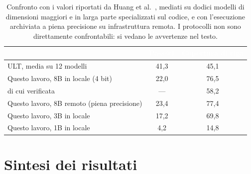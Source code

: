 \begin{table}[H]
\centering
\caption{Confronto con i valori riportati da Huang et al.~\cite{huang2025ult},
mediati su dodici modelli di dimensioni maggiori e in larga parte specializzati
sul codice, e con l'esecuzione archiviata a piena precisione su infrastruttura
remota. I protocolli non sono direttamente confrontabili: si vedano le
avvertenze nel testo.}
\label{tab:confronto}
\begin{tabular}{lcc}
\hline
\rowcolor{intest}
& \textcolor{white}{\textbf{Pass@1}} &
\textcolor{white}{\textbf{Copertura di riga}} \\
\hline
ULT, media su 12 modelli \cite{huang2025ult} & 41,3 & 45,1 \\
\hline
\rowcolor{accento}
Questo lavoro, 8B in locale (4 bit) & 22,0 & 76,5 \\
\rowcolor{accento}
\quad di cui verificata             & ---  & 58,2 \\
Questo lavoro, 8B remoto (piena precisione) & 23,4 & 77,4 \\
\hline
Questo lavoro, 3B in locale & 17,2 & 69,8 \\
Questo lavoro, 1B in locale &  4,2 & 14,8 \\
\hline
\end{tabular}
\end{table}


\section{Sintesi dei risultati}
\label{sec:ris-sintesi}
%
%
%
